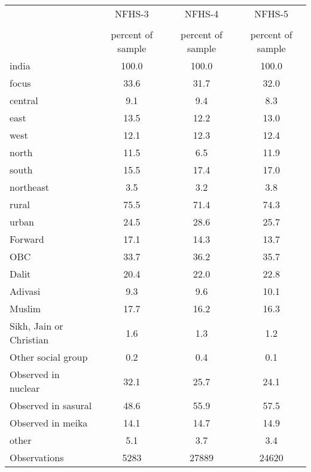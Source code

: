 {
\def\sym#1{\ifmmode^{#1}\else\(^{#1}\)\fi}
\begin{tabular}{l*{3}{c}}
\toprule
                    &      NFHS-3&      NFHS-4&      NFHS-5\\
                    &\multicolumn{1}{c}{}&\multicolumn{1}{c}{}&\multicolumn{1}{c}{}\\
                    &percent of sample&percent of sample&percent of sample\\
\midrule
india               &       100.0&       100.0&       100.0\\
focus               &        33.6&        31.7&        32.0\\
central             &         9.1&         9.4&         8.3\\
east                &        13.5&        12.2&        13.0\\
west                &        12.1&        12.3&        12.4\\
north               &        11.5&         6.5&        11.9\\
south               &        15.5&        17.4&        17.0\\
northeast           &         3.5&         3.2&         3.8\\
rural               &        75.5&        71.4&        74.3\\
urban               &        24.5&        28.6&        25.7\\
Forward             &        17.1&        14.3&        13.7\\
OBC                 &        33.7&        36.2&        35.7\\
Dalit               &        20.4&        22.0&        22.8\\
Adivasi             &         9.3&         9.6&        10.1\\
Muslim              &        17.7&        16.2&        16.3\\
Sikh, Jain or Christian&         1.6&         1.3&         1.2\\
Other social group  &         0.2&         0.4&         0.1\\
Observed in nuclear &        32.1&        25.7&        24.1\\
Observed in sasural &        48.6&        55.9&        57.5\\
Observed in meika   &        14.1&        14.7&        14.9\\
other               &         5.1&         3.7&         3.4\\
\midrule
Observations        &        5283&       27889&       24620\\
\bottomrule
\end{tabular}
}
